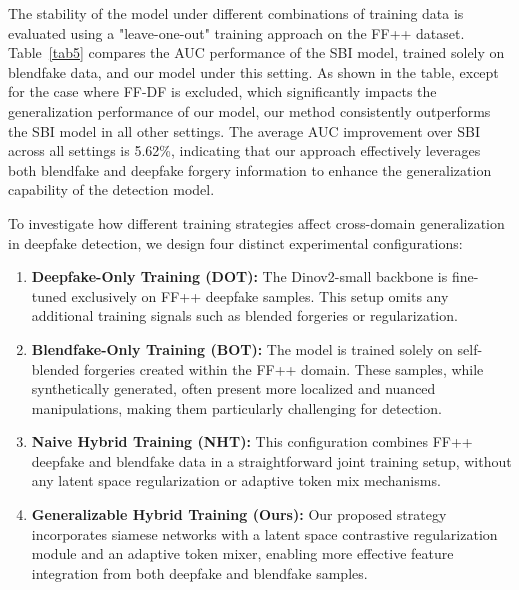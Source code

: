 \documentclass[final,5p,times]{elsarticle}
\begin{document}
The stability of the model under different combinations of training data is evaluated using a "leave-one-out" training approach on the FF++ dataset. Table~\ref{tab5} compares the AUC performance of the SBI model, trained solely on blendfake data, and our model under this setting. As shown in the table, except for the case where FF-DF is excluded, which significantly impacts the generalization performance of our model, our method consistently outperforms the SBI model in all other settings. The average AUC improvement over SBI across all settings is 5.62\%, indicating that our approach effectively leverages both blendfake and deepfake forgery information to enhance the generalization capability of the detection model.

To investigate how different training strategies affect cross-domain generalization in deepfake detection, we design four distinct experimental configurations:

\begin{enumerate}
    \item \textbf{Deepfake-Only Training (DOT):} The Dinov2-small backbone is fine-tuned exclusively on FF++ deepfake samples. This setup omits any additional training signals such as blended forgeries or regularization.
    
    \item \textbf{Blendfake-Only Training (BOT):} The model is trained solely on self-blended forgeries created within the FF++ domain. These samples, while synthetically generated, often present more localized and nuanced manipulations, making them particularly challenging for detection.
    
    \item \textbf{Naive Hybrid Training (NHT):} This configuration combines FF++ deepfake and blendfake data in a straightforward joint training setup, without any latent space regularization or adaptive token mix mechanisms.
    
    \item \textbf{Generalizable Hybrid Training (Ours):} Our proposed strategy incorporates siamese networks with a latent space contrastive regularization module and an adaptive token mixer, enabling more effective feature integration from both deepfake and blendfake samples.
\end{enumerate}
\end{document}
